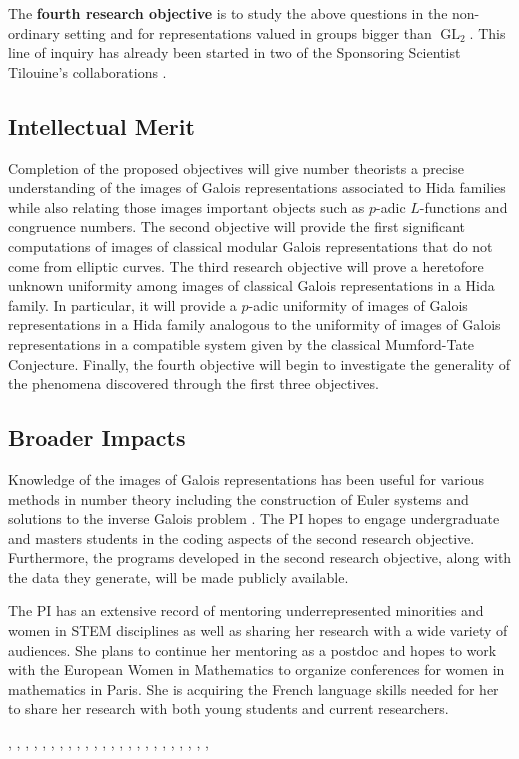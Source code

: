 \documentclass[11pt]{amsart}
\theoremstyle{definition}
\theoremstyle{remark}
\DeclareMathOperator{\GL}{GL}
\begin{document}
The \textbf{fourth research objective} is to study the above questions in the non-ordinary setting and for representations valued in groups bigger than $\GL_2$.  This line of inquiry has already been started in two of the Sponsoring Scientist Tilouine's collaborations \cite{CIT15, HidaTilouine15}.  

\subsection*{Intellectual Merit}
Completion of the proposed objectives will give number theorists a precise understanding of the images of Galois representations associated to Hida families while also relating those images important objects such as $p$-adic $L$-functions and congruence numbers.  The second objective will provide the first significant computations of images of classical modular Galois representations that do not come from elliptic curves.  The third research objective will prove a heretofore unknown uniformity among images of classical Galois representations in a Hida family.  In particular, it will provide a $p$-adic uniformity of images of Galois representations in a Hida family analogous to the uniformity of images of Galois representations in a compatible system given by the classical Mumford-Tate Conjecture.  Finally, the fourth objective will begin to investigate the generality of the phenomena discovered through the first three objectives.

\subsection*{Broader Impacts}
Knowledge of the images of Galois representations has been useful for various methods in number theory including the construction of Euler systems \cite{LLZ14, Loeffler14} and solutions to the inverse Galois problem \cite{Yun14, Zywina15a}.  The PI hopes to engage undergraduate and masters students in the coding aspects of the second research objective.  Furthermore, the programs developed in the second research objective, along with the data they generate, will be made publicly available.  

The PI has an extensive record of mentoring underrepresented minorities and women in STEM disciplines as well as sharing her research with a wide variety of audiences.  She plans to continue her mentoring as a postdoc and hopes to work with the European Women in Mathematics to organize conferences for women in mathematics in Paris.  She is acquiring the French language skills needed for her to share her research with both young students and current researchers. 
\newpage

\cite{Serre68}, \cite{Deligne71}, \cite{Ribet83}, \cite{Momose81}, \cite{Hida86a}, \cite{MazurWiles86}, \cite{Hida86b}, \cite{Fischman02}, \cite{Hida15}, \cite{Lang15}, \cite{Pink93}, \cite{HidaGME}, \cite{Manoharmayum15}, \cite{BCLMN15}, \cite{RouseZureickBrown15}, \cite{Sutherland15}, \cite{Zywina15b}, \cite{Zywina15a}, \cite{HidaTilouine15}, \cite{CIT15}, \cite{LLZ14}, \cite{Loeffler14}, \cite{Yun14}, \cite{Ribet77}, \cite{LMFDB}

{}

\end{document}
